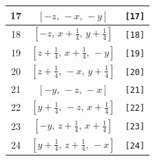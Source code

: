 \documentclass[fleqn,8pt]{jsarticle}
\begin{document}
\begin{longtable}{ccc}
17 & $\left[ - z,\, - x,\, - y \right]$ & {\tt [17]} \\ \hline
18 & $\left[ - z,\, x + \frac{1}{4},\, y + \frac{1}{4} \right]$ & {\tt [18]} \\ \hline
19 & $\left[ z + \frac{1}{4},\, x + \frac{1}{4},\, - y \right]$ & {\tt [19]} \\ \hline
20 & $\left[ z + \frac{1}{4},\, - x,\, y + \frac{1}{4} \right]$ & {\tt [20]} \\ \hline
21 & $\left[ - y,\, - z,\, - x \right]$ & {\tt [21]} \\ \hline
22 & $\left[ y + \frac{1}{4},\, - z,\, x + \frac{1}{4} \right]$ & {\tt [22]} \\ \hline
23 & $\left[ - y,\, z + \frac{1}{4},\, x + \frac{1}{4} \right]$ & {\tt [23]} \\ \hline
24 & $\left[ y + \frac{1}{4},\, z + \frac{1}{4},\, - x \right]$ & {\tt [24]} \\
\end{longtable}
\end{document}
